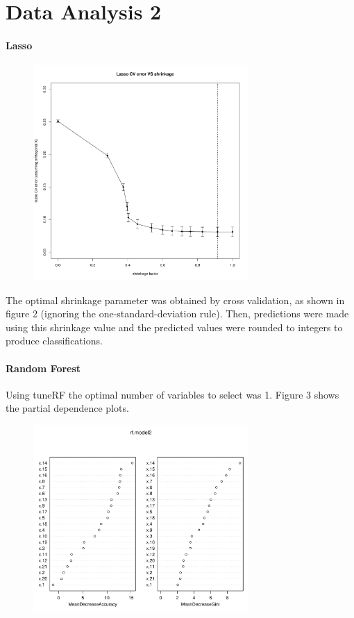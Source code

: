 \documentclass{article}
\begin{document}
\section*{Data Analysis 2}
\paragraph{Lasso}

\begin{figure}[h]				%
	\centering
	\includegraphics[width=8.2cm]{DA2/Plots/Lasso_CVerr_VS_S.pdf}
	\caption{}
\end{figure}

The optimal shrinkage parameter was obtained by cross validation, as shown in figure 2 (ignoring the one-standard-deviation rule). Then, predictions were made using this shrinkage value and the predicted values were rounded to integers to produce classifications.

\paragraph{Random Forest}

Using tuneRF the optimal number of variables to select was 1. Figure 3 shows the partial dependence plots.

\begin{figure}[h]				%
	\centering
	\includegraphics[width=8.2cm]{DA2/Plots/RF_partial_dependence.pdf}
	\caption{}
\end{figure}
\end{document}
